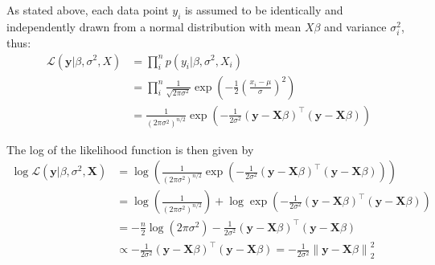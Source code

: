 \documentclass[12pt,a4paper]{article}
\newcommand{\norm}[1]{\left\lVert#1\right\rVert}
\begin{document}
As stated above, each data point $y_i$ is assumed to be identically and independently drawn from a normal distribution with mean $X\beta$ and variance $\sigma_i^2$, thus:
\begin{align}
\mathcal{L}(\mathbf{y}|\beta, \sigma^2, X) 	&= \prod_i^n p(y_i|\beta, \sigma^2, X_i) \nonumber\\
						&= \prod_i^n \frac{1}{\sqrt{2\pi\sigma^2}} \exp\left(-\frac{1}{2}\left(\frac{x_i-\mu}{\sigma}\right)^2\right) \nonumber\\
						&= \frac{1}{(2\pi\sigma^2)^{n/2}}\exp\left(-\frac{1}{2\sigma^2}(\mathbf{y}-\mathbf{X}\beta)^\top(\mathbf{y}-\mathbf{X}\beta)\right) \label{eq:likelihood}
\end{align}

The log of the likelihood function is then given by 
\begin{align*}
\log \mathcal{L}( \mathbf{y} |\beta, \sigma^2 , \mathbf{X}) &= \log \left( \frac{1}{(2\pi\sigma^2)^{n/2}} \exp\left(-\frac{1}{2\sigma^2} (\mathbf{y} - \mathbf{X}\beta)^\top (\mathbf{y} - \mathbf{X}\beta)\right) \right) \\
&= \log \left( \frac{1}{(2\pi\sigma^2)^{n/2}} \right) + \log \exp\left(-\frac{1}{2\sigma^2} (\mathbf{y} - \mathbf{X}\beta)^\top (\mathbf{y} - \mathbf{X}\beta)\right) \\
&= -\frac{n}{2} \log(2\pi\sigma^2) - \frac{1}{2\sigma^2} (\mathbf{y} - \mathbf{X}\beta)^\top (\mathbf{y} - \mathbf{X}\beta)\\
&\propto - \frac{1}{2\sigma^2} (\mathbf{y} - \mathbf{X}\beta)^\top (\mathbf{y} - \mathbf{X}\beta) = - \frac{1}{2\sigma^2}\norm{\mathbf{y} - \mathbf{X}\beta}_2^2\\
\end{align*}
\end{document}
